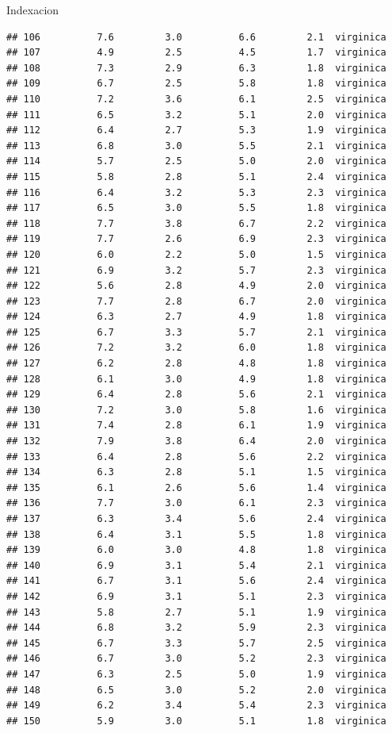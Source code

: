 \documentclass[
  ignorenonframetext,
]{beamer}
\begin{document}
\begin{frame}[fragile]{Indexacion}
\begin{verbatim}
## 106          7.6         3.0          6.6         2.1  virginica
## 107          4.9         2.5          4.5         1.7  virginica
## 108          7.3         2.9          6.3         1.8  virginica
## 109          6.7         2.5          5.8         1.8  virginica
## 110          7.2         3.6          6.1         2.5  virginica
## 111          6.5         3.2          5.1         2.0  virginica
## 112          6.4         2.7          5.3         1.9  virginica
## 113          6.8         3.0          5.5         2.1  virginica
## 114          5.7         2.5          5.0         2.0  virginica
## 115          5.8         2.8          5.1         2.4  virginica
## 116          6.4         3.2          5.3         2.3  virginica
## 117          6.5         3.0          5.5         1.8  virginica
## 118          7.7         3.8          6.7         2.2  virginica
## 119          7.7         2.6          6.9         2.3  virginica
## 120          6.0         2.2          5.0         1.5  virginica
## 121          6.9         3.2          5.7         2.3  virginica
## 122          5.6         2.8          4.9         2.0  virginica
## 123          7.7         2.8          6.7         2.0  virginica
## 124          6.3         2.7          4.9         1.8  virginica
## 125          6.7         3.3          5.7         2.1  virginica
## 126          7.2         3.2          6.0         1.8  virginica
## 127          6.2         2.8          4.8         1.8  virginica
## 128          6.1         3.0          4.9         1.8  virginica
## 129          6.4         2.8          5.6         2.1  virginica
## 130          7.2         3.0          5.8         1.6  virginica
## 131          7.4         2.8          6.1         1.9  virginica
## 132          7.9         3.8          6.4         2.0  virginica
## 133          6.4         2.8          5.6         2.2  virginica
## 134          6.3         2.8          5.1         1.5  virginica
## 135          6.1         2.6          5.6         1.4  virginica
## 136          7.7         3.0          6.1         2.3  virginica
## 137          6.3         3.4          5.6         2.4  virginica
## 138          6.4         3.1          5.5         1.8  virginica
## 139          6.0         3.0          4.8         1.8  virginica
## 140          6.9         3.1          5.4         2.1  virginica
## 141          6.7         3.1          5.6         2.4  virginica
## 142          6.9         3.1          5.1         2.3  virginica
## 143          5.8         2.7          5.1         1.9  virginica
## 144          6.8         3.2          5.9         2.3  virginica
## 145          6.7         3.3          5.7         2.5  virginica
## 146          6.7         3.0          5.2         2.3  virginica
## 147          6.3         2.5          5.0         1.9  virginica
## 148          6.5         3.0          5.2         2.0  virginica
## 149          6.2         3.4          5.4         2.3  virginica
## 150          5.9         3.0          5.1         1.8  virginica
\end{verbatim}


\end{frame}
\end{document}
